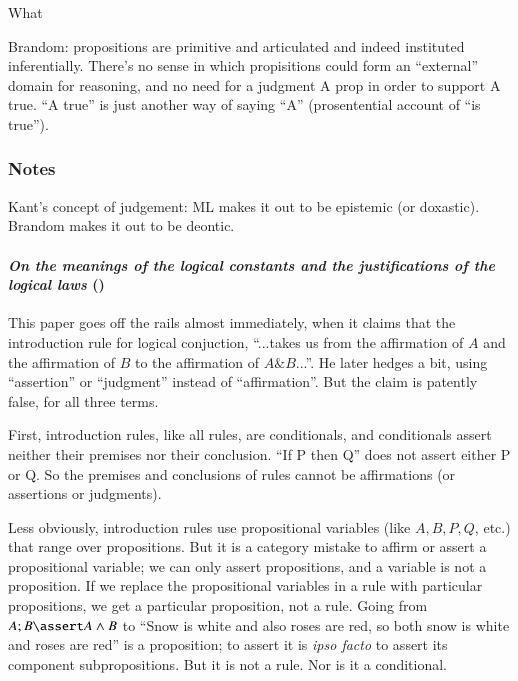 What

Brandom: propositions are primitive and articulated and indeed
instituted inferentially. There's no sense in which propisitions could
form an ``external'' domain for reasoning, and no need for a judgment
A prop in order to support A true. ``A true'' is just another way of
saying ``A'' (prosentential account of ``is true'').

\subsubsection{Notes}

Kant's concept of judgement: ML makes it out to be epistemic (or
doxastic). Brandom makes it out to be deontic.

\paragraph{\textit{On the meanings of the logical constants and the justifications of the logical laws} (\parencite{martin1996meanings})
  \newline}

This paper goes off the rails almost immediately, when it claims that
the introduction rule for logical conjuction,
``...takes us from the affirmation of \(A\) and the affirmation of \(B\) to
the affirmation of \(A\&B\)...''. He later hedges a bit, using
``assertion'' or ``judgment'' instead of ``affirmation''. But the
claim is patently false, for all three terms.

First, introduction rules, like all rules, are conditionals, and
conditionals assert neither their premises nor their conclusion. ``If
P then Q'' does not assert either P or Q. So the premises and
conclusions of rules cannot be affirmations (or assertions or
judgments).

Less obviously, introduction rules use propositional variables (like
\(A, B, P, Q\), etc.) that range over propositions. But it is a
category mistake to affirm or assert a propositional variable; we can
only assert propositions, and a variable is not a proposition. If
we replace the propositional variables in a rule with particular
propositions, we get a particular proposition, not a rule. Going from
\(A; B \linfer A\land B\) to ``Snow is white and also roses are red, so
both snow is white and roses are red'' is a proposition; to assert it
is \textit{ipso facto} to assert its component subpropositions. But it
is not a rule.  Nor is it a conditional.

